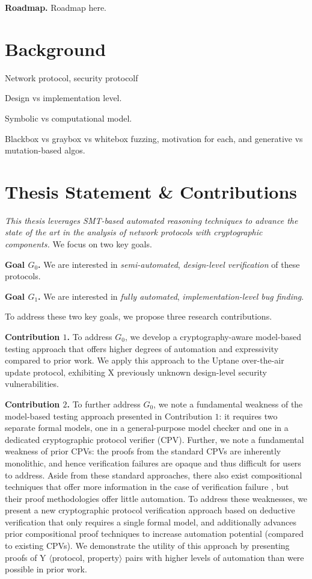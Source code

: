 \documentclass{article}
\theoremstyle{definition}
\begin{document}
\textbf{Roadmap.} Roadmap here.

\section{Background}
Network protocol, security protocolf

Design vs implementation level.

Symbolic vs computational model.

Blackbox vs graybox vs whitebox fuzzing, 
motivation for each, and generative vs mutation-based algos.


\section{Thesis Statement \& Contributions} 
\emph{This thesis leverages SMT-based automated reasoning techniques to advance
the state of the art in the analysis of network protocols with cryptographic 
components.} We focus on two key goals. 

\noindent\textbf{Goal $G_0$.}
We are interested in \emph{semi-automated}, \emph{design-level verification}
of these protocols.


\noindent\textbf{Goal $G_1$.}
We are interested in \emph{fully automated}, \emph{implementation-level bug finding}. 

To address these two key goals, we propose three research contributions.

\noindent\textbf{Contribution $1$.} 
To address $G_0$, we develop a cryptography-aware model-based testing approach 
that offers higher degrees of automation and expressivity compared to prior work. 
We apply this approach to the Uptane \cite{} over-the-air update protocol, exhibiting X 
previously unknown design-level security vulnerabilities. 

\noindent\textbf{Contribution $2$.}
To further address $G_0$, 
we note a fundamental weakness of the model-based testing approach presented in Contribution $1$: 
it requires two separate formal models, 
one in a general-purpose model checker and one in a dedicated cryptographic 
protocol verifier (CPV). 
Further, we note a fundamental weakness of prior CPVs: 
the proofs from the standard CPVs \cite{tamarin,proverif} are inherently 
monolithic, and hence verification failures are opaque and thus difficult for users to address. 
Aside from these standard approaches, 
there also exist compositional techniques that offer more information in the case of verification failure 
\cite{dystar}, but their proof methodologies offer little automation. 
To address these weaknesses, we present a new cryptographic protocol verification approach 
based on deductive verification that only requires a single formal model, 
and additionally advances prior compositional proof techniques to increase automation potential
(compared to existing CPVs).
We demonstrate the utility of this approach by presenting proofs 
of Y $\langle$protocol, property$\rangle$ pairs with higher levels of automation than were possible in prior work. 
\end{document}

